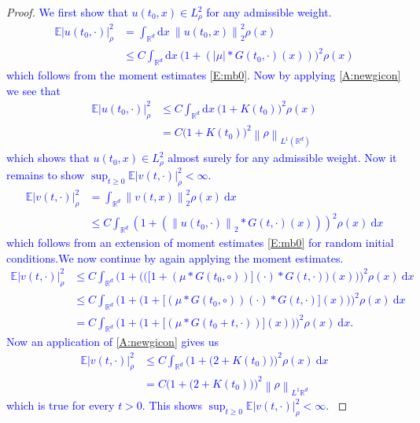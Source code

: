 \documentclass[a4paper,11pt]{article}
\numberwithin{equation}{section}
\theoremstyle{plain}
\theoremstyle{definition}
\newcommand{\R}{\mathbb{R}}
\newcommand{\E}{\mathbb{E}}
\newcommand{\Norm}[1]{\left\|  #1   \right\|}
\newcommand{\ud}{\ensuremath{\mathrm{d}}}
\begin{document}
\begin{proof} \textcolor{blue}{We first show that $u(t_0,x)\in L^2_\rho$ for any admissible weight.
\begin{align*}
\E |u(t_0,\cdot)|_\rho^2 &= \int_{\R^d}\ud x \: \Norm{u(t_0,x)}_2^2\rho(x)
\\& \le C  \int_{\R^d}\ud x \: \big(1+(|\mu|*G(t_0,\cdot)(x))\big)^2\rho(x) 
\end{align*}
which follows from the moment estimates \eqref{E:mb0}. Now by applying \eqref{A:newgicon} we see that 
\begin{align*}
\E |u(t_0,\cdot)|_\rho^2 & \le C \int_{\R^d}\ud x \: \big(1+K(t_0)\big)^2\rho(x)
\\& = C\big(1+K(t_0)\big)^2\Norm{\rho}_{L^1(\R^d)}
\end{align*}
which shows that $u(t_0,x)\in L^2_\rho$ almost surely for any admissible weight. Now it remains to show $\sup_{t\ge 0} \E |v(t,\cdot)|_\rho^2 < \infty$. 
\begin{align*}
\E |v(t,\cdot)|_\rho^2 &= \int_{\R^d}\Norm{v(t,x)}_2^2\rho(x) \: \ud x
\\& \le C \int_{\R^d} \left( 1+\left( \Norm{u(t_0,\cdot)}_2 * G(t,\cdot)(x) \right) \right)^2\rho(x) \: \ud x 
\end{align*}
which follows from an extension of moment estimates \eqref{E:mb0} for random initial conditions.We now continue by again applying the moment estimates.
\begin{align*}
\E |v(t,\cdot)|_\rho^2 & \le C \int_{\R^d} \bigg( 1+\bigg( \big(\big[1+(\mu*G(t_0,\circ))\big](\cdot) * G(t,\cdot)\big)(x) \bigg) \bigg)^2\rho(x) \: \ud x
\\& \le C \int_{\R^d} \bigg( 1+\bigg( 1+\big[(\mu*G(t_0,\circ))(\cdot) * G(t,\cdot)\big](x) \bigg) \bigg)^2\rho(x) \: \ud x
\\& = C \int_{\R^d} \bigg( 1+\bigg( 1+\big[(\mu*G(t_0+t,\cdot)) \big](x) \bigg) \bigg)^2\rho(x) \: \ud x.
\end{align*}
Now an application of \eqref{A:newgicon} gives us
\begin{align*}
\E |v(t,\cdot)|_\rho^2 &\le C \int_{\R^d} \bigg( 1+\bigg( 2+K(t_0) \bigg) \bigg)^2\rho(x) \: \ud x
\\&= C\bigg( 1+\bigg( 2+K(t_0) \bigg) \bigg)^2 \Norm{\rho}_{L^1{\R^d}}
\end{align*}
which is true for every $t>0$. This shows $\sup_{t\ge 0} \E |v(t,\cdot)|_\rho^2 < \infty$. 
}
\end{proof}
\end{document}
